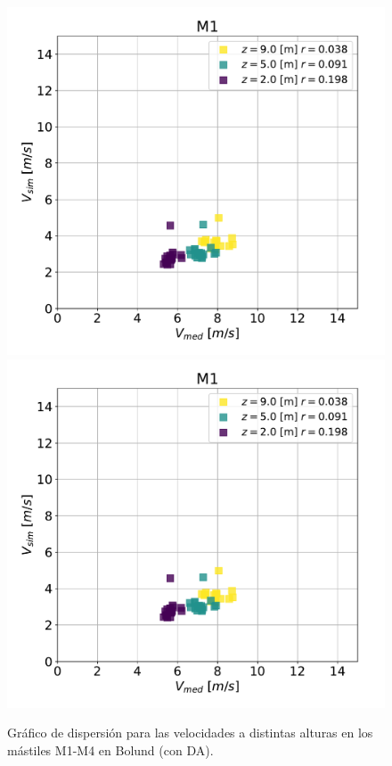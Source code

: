 \begin{figure}[H]
	\includegraphics[width=0.5\linewidth,page=3,trim={0cm 0cm 0cm 0cm},clip]{Imagenes/06/bol_da/corr}%
	\includegraphics[width=0.5\linewidth,page=4,trim={0cm 0cm 0cm 0cm},clip]{Imagenes/06/bol_da/corr}%
	\caption{Gráfico de dispersión para las velocidades a distintas alturas en los mástiles M1-M4 en Bolund (con DA).}
	\label{fig:06_corr_bol1_da}
\end{figure}
\vspace*{\fill}
\newpage
\vspace*{\fill}
